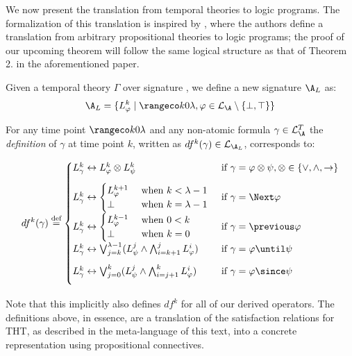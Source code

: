 We now present the translation from temporal theories to logic
programs. The formalization of this translation is inspired by
\cite[p. 9]{capeva05a}, where the authors define a translation from
arbitrary propositional theories to logic programs; the proof of our
upcoming theorem will follow the same logical structure as that of
Theorem 2. in the aforementioned paper.


Given a temporal theory $\Gamma$ over signature \A, we
define a new signature $\A_L$ as:
$$
\A_L = \{ L_{\varphi}^k \mid \kinlambda, \varphi \in
\mathcal{L}_\A\setminus \{ \bot, \top \} \}
$$

For any time point $\kinlambda$ and any non-atomic formula $\gamma \in \mathcal{L}_\A^T$ the \emph{definition} of $\gamma$ at time point $k$, written as $df^k(\gamma) \in \mathcal{L}_{\A_L}$, corresponds to:

\begin{align*}
df^k(\gamma) \defeq \begin{cases}
  L^k_{\gamma} \leftrightarrow L_{\varphi}^k \otimes L_{\psi}^k 
  &\text{ if } \gamma = \varphi \otimes \psi, \otimes \in \{ \vee, \wedge, \rightarrow \}\\[2ex]
  L^k_\gamma \leftrightarrow \begin{cases} 
    L^{k+1}_{\varphi} &\text{ when } k < \lambda - 1\\
    \bot &\text{ when } k = \lambda - 1
    \end{cases}
  &\text{ if } \gamma = \Next \varphi \\[2ex]
  L^k_{\gamma} \leftrightarrow \begin{cases} 
    L^{k-1}_{\varphi} &\text{ when } 0 < k\\
    \bot &\text{ when } k = 0
    \end{cases}
  &\text{ if } \gamma = \previous \varphi \\[2ex]
  L^k_{\gamma} \leftrightarrow \bigvee_{j=k}^{\lambda-1}(L_\psi^j \wedge \bigwedge_{i=k+1}^{j}L_{\varphi}^i)
  &\text{ if } \gamma = \varphi \until \psi \\[2ex]
  L^k_{\gamma} \leftrightarrow \bigvee_{j=0}^{k}(L_\psi^j \wedge \bigwedge_{i=j+1}^{k}L_{\varphi}^i)
  &\text{ if } \gamma = \varphi \since \psi \\[2ex]
\end{cases}
\end{align*}

Note that this implicitly also defines $df^k$ for all of our derived
operators. The definitions above, in essence, are a translation of the
satisfaction relations for THT, as described in the meta-language of
this text, into a concrete representation using propositional
connectives.

